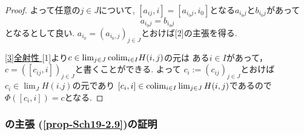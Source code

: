 \documentclass[dvipdfmx,a4paper,11pt]{article}
\newcommand{\colim}{{\rm colim}}
\theoremstyle{definition}
\begin{document}
\begin{proof}
よって任意の$j \in J$について, $[a_{ij}, i] = [a_{i_{0}j}, i_{0}]$となる$a_{i_{0}j}$と$b_{i_{0}j}$があって
$$
a_{i_{0}j} = b_{i_{0}j}
$$
となるとして良い. 
$a_{i_0} = (a_{i_{0},j})_{j \in J}$とおけば[2]の主張を得る. 

\underline{[3]全射性 } 
[1]より$c \in \lim_{j \in J}\colim_{i \in I} H(i,j)$の元は
ある$i \in I$があって， $c= ([c_{ij}, i])_{j \in J}$と書くことができる. 
よって
$c_{i}:=(c_{ij})_{j \in J}$とおけば$c_i \in \lim_{J}H(i.j)$の元であり
$[c_{i} , i] \in \colim_{i \in I} \lim_{j \in J}H(i,j)$であるので
$\Phi([c_i , i])=c$となる. 
\end{proof}




\subsubsection{\cite[Proposition 2.9]{Sch19}の主張 (\ref{prop-Sch19-2.9})の証明}
\end{document}
